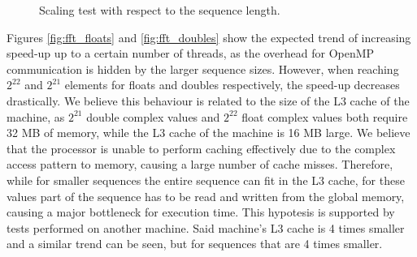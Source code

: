 \begin{figure}[ht]
    \centering
    \caption{Scaling test with respect to the sequence length.}
    \label{fig:fft_performance}
\end{figure}

Figures \ref{fig:fft_floats} and \ref{fig:fft_doubles} show the expected trend of increasing speed-up up to a certain number of threads, as the overhead for OpenMP communication is hidden by the larger sequence sizes. However, when reaching $2^{22}$ and $2^{21}$ elements for floats and doubles respectively, the speed-up decreases drastically. We believe this behaviour is related to the size of the L3 cache of the machine, as $2^{21}$ double complex values and $2^{22}$ float complex values both require 32 MB of memory, while the L3 cache of the machine is 16 MB large. We believe that the processor is unable to perform caching effectively due to the complex access pattern to memory, causing a large number of cache misses. Therefore, while for smaller sequences the entire sequence can fit in the L3 cache, for these values part of the sequence has to be read and written from the global memory, causing a major bottleneck for execution time. This hypotesis is supported by tests performed on another machine. Said machine's L3 cache is 4 times smaller and a similar trend can be seen, but for sequences that are 4 times smaller.